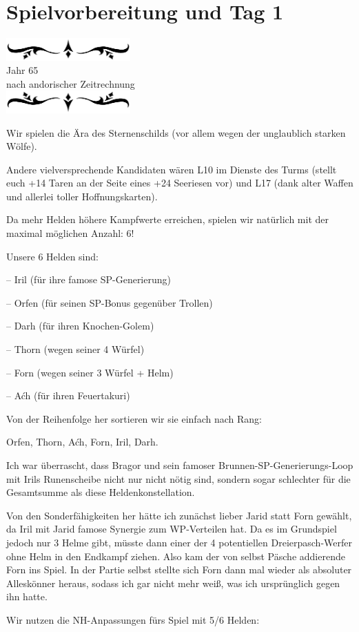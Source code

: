 \documentclass[10pt, a4paper, oneside]{book}
\newcommand{\az}[1]{%
    \begin{center}
        \includegraphics[width=180px]{Das Erbe des Wunderkindes/verzierung1.png}\\
        {\Huge #1} \\
        {nach andorischer Zeitrechnung}\\
        \includegraphics[width=180px]{Das Erbe des Wunderkindes/verzierung2.png}
    \end{center}
    \extramarks{}{#1 a.Z.}
}
\begin{document}
{\parindent0pt


\section{Spielvorbereitung und Tag 1}

\az{Jahr 65}

Wir spielen die Ära des Sternenschilds (vor allem wegen der unglaublich starken Wölfe).

Andere vielversprechende Kandidaten wären L10 im Dienste des Turms (stellt euch +14 Taren an der Seite eines +24 Seeriesen vor) und L17 (dank alter Waffen und allerlei toller Hoffnungskarten).\bigskip



Da mehr Helden höhere Kampfwerte erreichen, spielen wir natürlich mit der maximal möglichen Anzahl: 6!

Unsere 6 Helden sind:

– Iril (für ihre famose SP-Generierung)

– Orfen (für seinen SP-Bonus gegenüber Trollen)

– Darh (für ihren Knochen-Golem)

– Thorn (wegen seiner 4 Würfel)

– Forn (wegen seiner 3 Würfel + Helm)

– Aćh (für ihren Feuertakuri)



Von der Reihenfolge her sortieren wir sie einfach nach Rang:

Orfen, Thorn, Aćh, Forn, Iril, Darh.



Ich war überrascht, dass Bragor und sein famoser Brunnen-SP-Generierungs-Loop mit Irils Runenscheibe nicht nur nicht nötig sind, sondern sogar schlechter für die Gesamtsumme als diese Heldenkonstellation.



Von den Sonderfähigkeiten her hätte ich zunächst lieber Jarid statt Forn gewählt, da Iril mit Jarid famose Synergie zum WP-Verteilen hat. Da es im Grundspiel jedoch nur 3 Helme gibt, müsste dann einer der 4 potentiellen Dreierpasch-Werfer ohne Helm in den Endkampf ziehen. Also kam der von selbst Päsche addierende Forn ins Spiel. In der Partie selbst stellte sich Forn dann mal wieder als absoluter Alleskönner heraus, sodass ich gar nicht mehr weiß, was ich ursprünglich gegen ihn hatte.\bigskip



Wir nutzen die NH-Anpassungen fürs Spiel mit 5/6 Helden:

}
\end{document}
